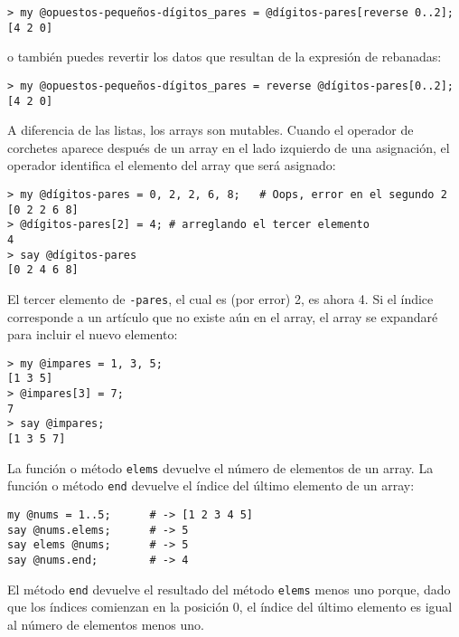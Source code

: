 \begin{lstlisting}
> my @opuestos-pequeños-dígitos_pares = @dígitos-pares[reverse 0..2];
[4 2 0]
\end{lstlisting}

o también puedes revertir los datos que resultan de la expresión
de rebanadas:

\begin{lstlisting}
> my @opuestos-pequeños-dígitos_pares = reverse @dígitos-pares[0..2];
[4 2 0]
\end{lstlisting}

A diferencia de las listas, los arrays son mutables. 
Cuando el operador de corchetes aparece después de un array 
en el lado izquierdo de una asignación, el operador identifica el
elemento del array que será asignado:

\begin{lstlisting}
> my @dígitos-pares = 0, 2, 2, 6, 8;   # Oops, error en el segundo 2
[0 2 2 6 8]
> @dígitos-pares[2] = 4; # arreglando el tercer elemento
4
> say @dígitos-pares
[0 2 4 6 8]
\end{lstlisting}
%

El tercer elemento de {\tt {}-pares}, el cual es (por error) 2,
es ahora 4. Si el índice corresponde a un artículo que no existe aún
en el array, el array se expandaré para incluir el nuevo elemento:

\begin{lstlisting}
> my @impares = 1, 3, 5;
[1 3 5]
> @impares[3] = 7;
7
> say @impares;
[1 3 5 7]
\end{lstlisting}


La función o método {\tt elems} devuelve el número
de elementos de un array. La función o método {\tt end}
devuelve el índice del último elemento de un array:

\begin{lstlisting}
my @nums = 1..5;      # -> [1 2 3 4 5]
say @nums.elems;      # -> 5
say elems @nums;      # -> 5
say @nums.end;        # -> 4
\end{lstlisting}

El método {\tt end} devuelve el resultado del método 
{\tt elems} menos uno porque, dado que los índices comienzan
en la posición 0, el índice del último elemento es igual
al número de elementos menos uno.

